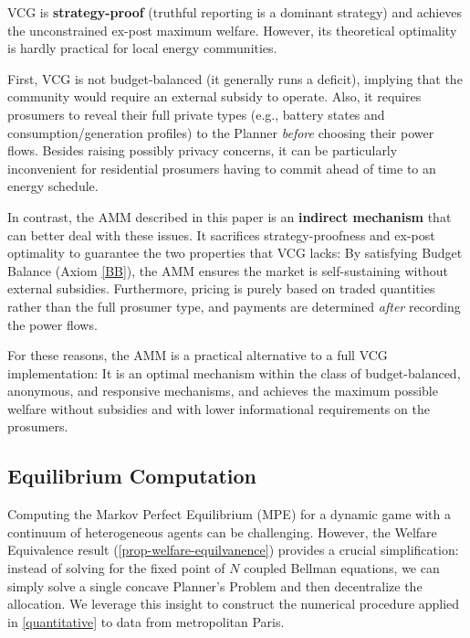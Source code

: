 \documentclass[12pt, notitlepage]{article}
\begin{document}
VCG is \textbf{strategy-proof} (truthful reporting is a dominant strategy) and achieves the unconstrained ex-post maximum welfare. However, its theoretical optimality is hardly practical for local energy communities. 

First, VCG is not budget-balanced (it generally runs a deficit), implying that the community would require an external subsidy to operate. Also, it requires prosumers to reveal their full private types (e.g., battery states and   consumption/generation profiles) to the Planner \textit{before} choosing their power flows. Besides raising possibly privacy concerns, it can be particularly inconvenient for  residential prosumers having to commit ahead of time to an energy schedule.

In contrast, the AMM described in this paper is an \textbf{indirect mechanism} that can better deal with these issues. It sacrifices strategy-proofness and ex-post optimality to guarantee the two properties that VCG lacks: By satisfying Budget Balance (Axiom \ref{BB}), the AMM ensures the market is self-sustaining without external subsidies. Furthermore, pricing is purely based on traded quantities rather than the full prosumer type, and  payments are determined \textit{after} recording the power flows.

For these reasons, the AMM is a practical alternative to a full VCG implementation: It is an optimal mechanism within the class of budget-balanced, anonymous, and responsive mechanisms, and  achieves the maximum possible welfare without subsidies and with lower informational requirements on the prosumers.







\subsection{Equilibrium Computation}\label{sec:eq-computation}

Computing the Markov Perfect Equilibrium (MPE) for a dynamic game with a continuum of heterogeneous agents can be challenging. However, the Welfare Equivalence result (\cref{prop-welfare-equilvanence}) provides a crucial simplification: instead of solving for the fixed point of $N$ coupled Bellman equations, we can simply solve a single concave Planner's Problem and then decentralize the allocation. We leverage this insight to construct the numerical procedure applied in \cref{quantitative} to data from metropolitan Paris.
\end{document}

